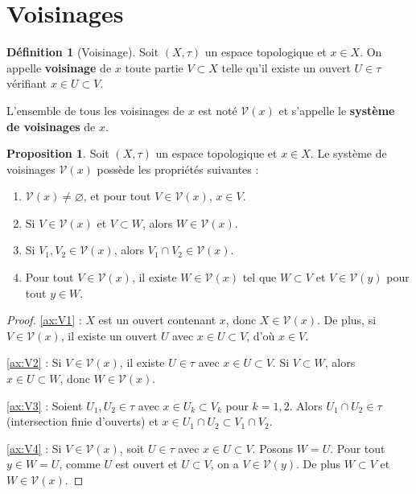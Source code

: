 \documentclass[12pt,a4paper,openany]{book}
\theoremstyle{definition}
\newtheorem{definition}{Définition}[chapter]
\theoremstyle{cours}
\newtheorem{proposition}[theoreme]{Proposition}
\theoremstyle{coursnormal}
\newcommand{\Vois}[1]{\mathcal{V}(#1)}
\begin{document}
\section{Voisinages}
\label{sec:voisinages}

\begin{definition}[Voisinage]\label{def:voisinage}
  Soit $(X,\tau)$ un espace topologique et $x \in X$. On appelle \textbf{voisinage} de $x$ toute partie $V \subset X$ telle qu'il existe un ouvert $U \in \tau$ vérifiant $x \in U \subset V$.

  L'ensemble de tous les voisinages de $x$ est noté $\Vois{x}$ et s'appelle le \textbf{système de voisinages} de $x$.
\end{definition}

\begin{proposition}\label{prop:proprietes-voisinages}
  Soit $(X,\tau)$ un espace topologique et $x \in X$. Le système de voisinages $\Vois{x}$ possède les propriétés suivantes :
  \begin{enumerate}[label=\textbf{(V\arabic*)}]
    \item\label{ax:V1} $\Vois{x} \neq \varnothing$, et pour tout $V \in \Vois{x}$, $x \in V$.
    \item\label{ax:V2} Si $V \in \Vois{x}$ et $V \subset W$, alors $W \in \Vois{x}$.
    \item\label{ax:V3} Si $V_1, V_2 \in \Vois{x}$, alors $V_1 \cap V_2 \in \Vois{x}$.
    \item\label{ax:V4} Pour tout $V \in \Vois{x}$, il existe $W \in \Vois{x}$ tel que $W \subset V$ et $V \in \Vois{y}$ pour tout $y \in W$.
  \end{enumerate}
\end{proposition}

\begin{proof}
  \ref{ax:V1} : $X$ est un ouvert contenant $x$, donc $X \in \Vois{x}$. De plus, si $V \in \Vois{x}$, il existe un ouvert $U$ avec $x \in U \subset V$, d'où $x \in V$.

  \ref{ax:V2} : Si $V \in \Vois{x}$, il existe $U \in \tau$ avec $x \in U \subset V$. Si $V \subset W$, alors $x \in U \subset W$, donc $W \in \Vois{x}$.

  \ref{ax:V3} : Soient $U_1, U_2 \in \tau$ avec $x \in U_k \subset V_k$ pour $k = 1,2$. Alors $U_1 \cap U_2 \in \tau$ (intersection finie d'ouverts) et $x \in U_1 \cap U_2 \subset V_1 \cap V_2$.

  \ref{ax:V4} : Si $V \in \Vois{x}$, soit $U \in \tau$ avec $x \in U \subset V$. Posons $W = U$. Pour tout $y \in W = U$, comme $U$ est ouvert et $U \subset V$, on a $V \in \Vois{y}$. De plus $W \subset V$ et $W \in \Vois{x}$.
\end{proof}
\end{document}
